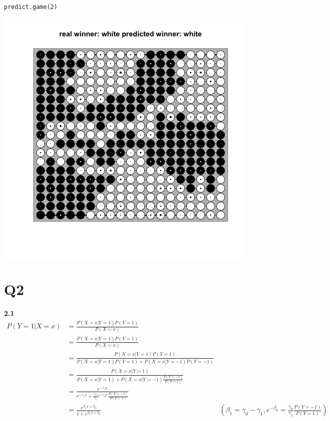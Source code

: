 \documentclass[11pt]{article}
\begin{document}
\begin{verbatim}
predict.game(2)
\end{verbatim}

\begin{center}
\includegraphics[width=.9\linewidth]{img/game2.png}
\end{center}





\section{Q2}
\label{sec:orgheadline4}

\textbf{2.1}
\begin{align*}
P(Y = 1 | X = x)
&= \frac{P(X = x | Y = 1)P(Y = 1)}{P(X = x)}
\\&= \frac{P(X = x | Y = 1)P(Y = 1)}{P(X = x)}
\\&= \frac{P(X = x | Y = 1)P(Y = 1)}{P(X = x|Y=1)P(Y=1)+P(X = x|Y=-1)P(Y=-1)}
\\&= \frac{P(X = x | Y = 1)}{P(X = x|Y=1)+P(X = x|Y=-1)\frac{P(Y=-1)}{P(Y=1)}}
\\&= \frac{ e^{-\gamma_1 x}}{e^{-\gamma_1 x}+ \frac{\gamma_0}{\gamma_1}e^{-\gamma_0 x}\frac{P(Y=-1)}{P(Y=1)}}
\\&= \frac{e^{\beta_1 x + \beta_0}}{1 + e^{\beta_1 x + \beta_0}}
& (\beta_1 = \gamma_0 - \gamma_1 , e^{-\beta_0} = \frac{\gamma_0}{\gamma_1}\frac{P(Y=-1)}{P(Y=1)})
\end{align*}
\end{document}
